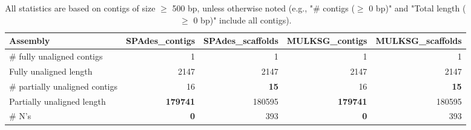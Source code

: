 \documentclass[12pt,a4paper]{article}
\begin{document}
\begin{table}[ht]
\begin{center}
\caption{All statistics are based on contigs of size $\geq$ 500 bp, unless otherwise noted (e.g., "\# contigs ($\geq$ 0 bp)" and "Total length ($\geq$ 0 bp)" include all contigs).}
\begin{tabular}{|l*{4}{|r}|}
\hline
Assembly & SPAdes\_contigs & SPAdes\_scaffolds & MULKSG\_contigs & MULKSG\_scaffolds \\ \hline
\# fully unaligned contigs & 1 & 1 & 1 & 1 \\ \hline
Fully unaligned length & 2147 & 2147 & 2147 & 2147 \\ \hline
\# partially unaligned contigs & 16 & {\bf 15} & 16 & {\bf 15} \\ \hline
Partially unaligned length & {\bf 179741} & 180595 & {\bf 179741} & 180595 \\ \hline
\# N's & {\bf 0} & 393 & {\bf 0} & 393 \\ \hline
\end{tabular}
\end{center}
\end{table}
\end{document}
